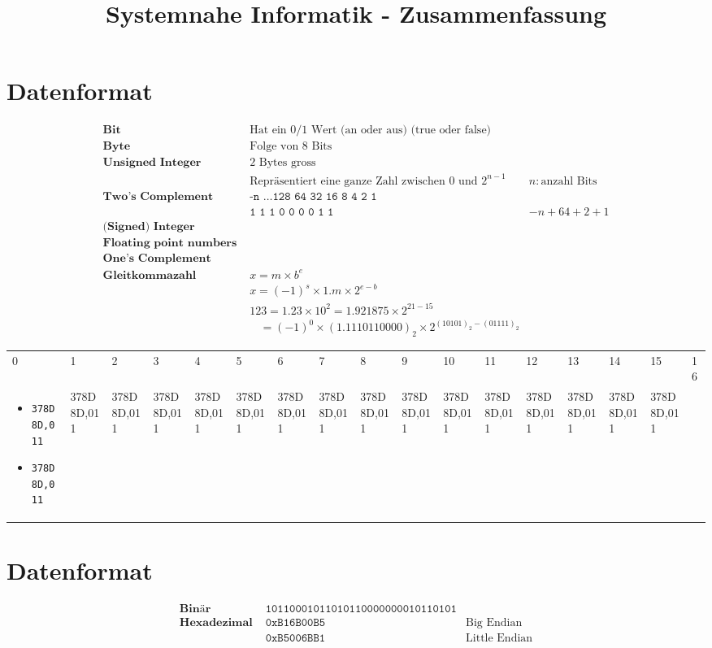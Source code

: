 \documentclass{article}
\title{Systemnahe Informatik - Zusammenfassung}
\begin{document}
	\section*{Datenformat}
		\begin{align*}
			\textbf{Bit } & \text{Hat ein 0/1 Wert (an oder aus) (true oder false)}\\
			\textbf{Byte } & \text{Folge von 8 Bits}\\
			\textbf{Unsigned Integer } & \text{2 Bytes gross}\\
			& \text{Repr\"asentiert eine ganze Zahl zwischen 0 und }2^{n-1} & n:\text{anzahl Bits}\\
			\textbf{Two's Complement } & \texttt{-n \ldots128\ 64\ 32\ 16\ \ 8\ \ 4\ \ 2\ \ 1}\\
			& \texttt{1 \ \ \ \ \ \ 1\ \ 1\ \ 0\ \ 0\ \ 0\ \ 0\ \ 1\ \ 1} & -n + 64 + 2 + 1\\
			\textbf{(Signed) Integer } & \\
			\textbf{Floating point numbers } & \\
			\textbf{One's Complement } & \\
			\textbf{Gleitkommazahl } & x = m \times b^e\\
			& x = (-1)^s \times 1.m \times 2^{e-b}\\
			& 123 = 1.23 \times 10^2 = 1.921875 \times 2^{21-15}\\
			&\ \ \ \ = (-1)^0 \times (1.1110110000)_2 \times 2^{(10101)_2 - (01111)_2}
		\end{align*}
\begin{tabular}{p{1.7cm}p{1.7cm}p{1.7cm}p{1.7cm}p{1.7cm}p{1.7cm}p{1.7cm}p{1.7cm}p{1.7cm}p{1.7cm}p{1.7cm}p{1.7cm}p{1.7cm}p{1.7cm}p{1.7cm}p{1.7cm}p{1.7cm}}
	0 & 1 & 2 & 3 & 4 & 5 & 6 & 7 & 8 & 9 & 10 & 11 & 12 & 13 & 14 & 15 & 16\\
	\begin{itemize}[label={}]
		\setlength\itemsep{-1.8em}
		\item \texttt{378D8D,011}
		\item \texttt{378D8D,011}
	\end{itemize} & 378D8D,011 & 378D8D,011 & 378D8D,011 & 378D8D,011 & 378D8D,011 & 378D8D,011 & 378D8D,011 & 378D8D,011 & 378D8D,011 & 378D8D,011 & 378D8D,011 & 378D8D,011 & 378D8D,011 & 378D8D,011 & 378D8D,011\\
\end{tabular}
	\section*{Datenformat}
		\begin{align*}
			\textbf{Bin\"ar } & \texttt{10110001011010110000000010110101}\\
			\textbf{Hexadezimal } & \texttt{0xB16B00B5} & \text{Big Endian}\\
			& \texttt{0xB5006BB1} & \text{Little Endian}\\
		\end{align*}
\end{document}
